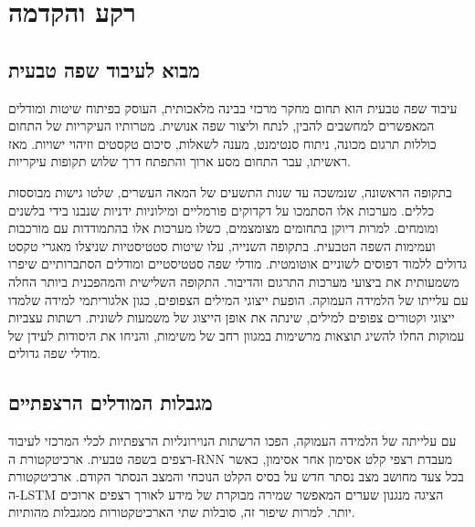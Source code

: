 \hypertarget{ux5e8ux5e7ux5e2-ux5d5ux5d4ux5e7ux5d3ux5deux5d4}{%
\section{רקע
והקדמה}\label{ux5e8ux5e7ux5e2-ux5d5ux5d4ux5e7ux5d3ux5deux5d4}}

\hypertarget{ux5deux5d1ux5d5ux5d0-ux5dcux5e2ux5d9ux5d1ux5d5ux5d3-ux5e9ux5e4ux5d4-ux5d8ux5d1ux5e2ux5d9ux5ea}{%
\subsection{מבוא לעיבוד שפה
טבעית}\label{ux5deux5d1ux5d5ux5d0-ux5dcux5e2ux5d9ux5d1ux5d5ux5d3-ux5e9ux5e4ux5d4-ux5d8ux5d1ux5e2ux5d9ux5ea}}

עיבוד שפה טבעית הוא תחום מחקר מרכזי בבינה מלאכותית, העוסק בפיתוח שיטות
ומודלים המאפשרים למחשבים להבין, לנתח וליצור שפה אנושית. מטרותיו העיקריות
של התחום כוללות תרגום מכונה, ניתוח סנטימנט, מענה לשאלות, סיכום טקסטים
וזיהוי ישויות. מאז ראשיתו, עבר התחום מסע ארוך והתפתח דרך שלוש תקופות
עיקריות.

בתקופה הראשונה, שנמשכה עד שנות התשעים של המאה העשרים, שלטו גישות מבוססות
כללים. מערכות אלו הסתמכו על דקדוקים פורמליים ומילוניות ידניות שנבנו בידי
בלשנים ומומחים. למרות דיוקן בתחומים מצומצמים, כשלו מערכות אלו בהתמודדות
עם מורכבות ועמימות השפה הטבעית. בתקופה השנייה, עלו שיטות סטטיסטיות
שניצלו מאגרי טקסט גדולים ללמוד דפוסים לשוניים אוטומטית. מודלי שפה
סטטיסטיים ומודלים הסתברותיים שיפרו משמעותית את ביצועי מערכות התרגום
והדיבור. התקופה השלישית והמהפכנית ביותר החלה עם עלייתו של הלמידה העמוקה.
הופעת ייצוגי המילים הצפופים, כגון אלגוריתמי למידה שלמדו ייצוגי וקטורים
צפופים למילים, שינתה את אופן הייצוג של משמעות לשונית. רשתות עצביות
עמוקות החלו להשיג תוצאות מרשימות במגוון רחב של משימות, והניחו את היסודות
לעידן של מודלי שפה גדולים.

\hypertarget{ux5deux5d2ux5d1ux5dcux5d5ux5ea-ux5d4ux5deux5d5ux5d3ux5dcux5d9ux5dd-ux5d4ux5e8ux5e6ux5e4ux5eaux5d9ux5d9ux5dd}{%
\subsection{מגבלות המודלים
הרצפתיים}\label{ux5deux5d2ux5d1ux5dcux5d5ux5ea-ux5d4ux5deux5d5ux5d3ux5dcux5d9ux5dd-ux5d4ux5e8ux5e6ux5e4ux5eaux5d9ux5d9ux5dd}}

עם עלייתה של הלמידה העמוקה, הפכו הרשתות הנוירונליות הרצפתיות לכלי המרכזי
לעיבוד רצפים בשפה טבעית. ארכיטקטורת ה-RNN מעבדת רצפי קלט אסימון אחר
אסימון, כאשר בכל צעד מחושב מצב נסתר חדש על בסיס הקלט הנוכחי והמצב הנסתר
הקודם. ארכיטקטורת ה-LSTM הציגה מנגנון שערים המאפשר שמירה מבוקרת של מידע
לאורך רצפים ארוכים יותר. למרות שיפור זה, סובלות שתי הארכיטקטורות ממגבלות
מהותיות.

